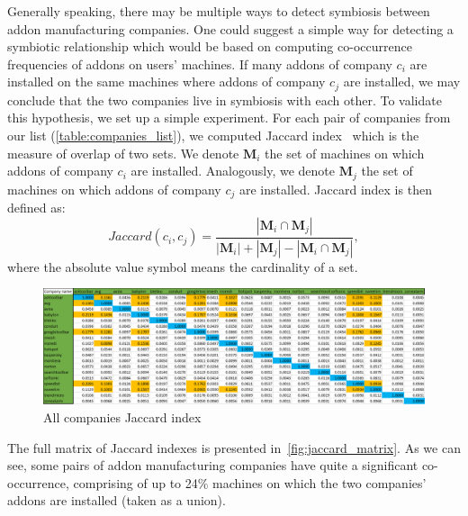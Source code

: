 \documentclass[11pt,oneside]{book}
\begin{document}
Generally speaking, there may be multiple ways to detect symbiosis between addon manufacturing companies. One could suggest a simple way for detecting a symbiotic relationship which would be based on computing co-occurrence frequencies of addons on users' machines. If many addons of company $c_i$ are installed on the same machines where addons of company $c_j$ are installed, we may conclude that the two companies live in symbiosis with each other. To validate this hypothesis, we set up a simple experiment. For each pair of companies from our list (\autoref{table:companies_list}), we computed Jaccard index~\citep{jaccard1912distribution} which is the measure of overlap of two sets. We denote $\mathbf{M}_i$ the set of machines on which addons of company $c_i$ are installed. Analogously, we denote $\mathbf{M}_j$ the set of machines on which addons of company $c_j$ are installed. Jaccard index is then defined as:
$$
Jaccard(c_i, c_j) = \frac{|\mathbf{M}_i \cap \mathbf{M}_j|}{|\mathbf{M}_i| + |\mathbf{M}_j| - |\mathbf{M}_i \cap \mathbf{M}_j|},
$$
where the absolute value symbol means the cardinality of a set.

\begin{figure}[!htbp]
\centering
\includegraphics[width=\linewidth]{figures/JaccardMatrix.png}
\caption{All companies Jaccard index}
\label{fig:jaccard_matrix}
\end{figure}

The full matrix of Jaccard indexes is presented in~\autoref{fig:jaccard_matrix}. As we can see, some pairs of addon manufacturing companies have quite a significant co-occurrence, comprising of up to 24\% machines on which the two companies' addons are installed (taken as a union). 
\end{document}
